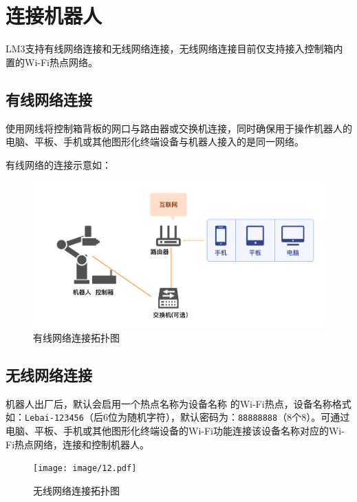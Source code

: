 \clearpage

\section{连接机器人}
LM3支持有线网络连接和无线网络连接，无线网络连接目前仅支持接入控制箱内置的Wi-Fi热点网络。
\subsection{有线网络连接}

使用网线将控制箱背板的网口与路由器或交换机连接，同时确保用于操作机器人的电脑、平板、手机或其他图形化终端设备与机器人接入的是同一网络。

有线网络的连接示意如：

\begin{figure}[ht]
    \centering
    \includegraphics[width=\textwidth]{image/1103/5.pdf}
    \caption{有线网络连接拓扑图}
    \label{fig:有线网络连接拓扑图}
\end{figure}

\clearpage

\subsection{无线网络连接}
机器人出厂后，默认会启用一个热点名称为设备名称  的Wi-Fi热点，设备名称格式如：\verb|Lebai-123456|（后6位为随机字符），默认密码为：\verb|88888888|（8个8）。可通过电脑、平板、手机或其他图形化终端设备的Wi-Fi功能连接该设备名称对应的Wi-Fi热点网络，连接和控制机器人。

\begin{figure}[ht]
    \centering
    \texttt{[image: image/12.pdf]}
    \caption{无线网络连接拓扑图}
    \label{fig:无线网络连接拓扑图}
\end{figure}

\clearpage

